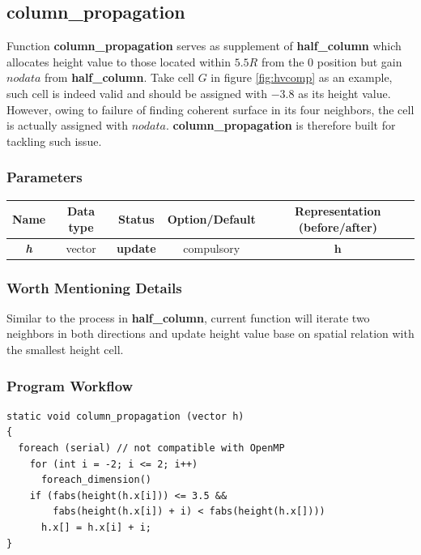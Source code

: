 \documentclass[a4paper]{article}
\newcommand{\func}[1]{\textbf{\textcolor{function}{#1}}}
\newcommand{\para}[1]{\textbf{\emph{\textcolor{para}{#1}}}}
\begin{document}
\subsection{\func{column\_propagation}}
Function \func{column\_propagation} serves as supplement of \func{half\_column} which allocates height value to those located within $5.5R$ from the 0 position but gain $nodata$ from \func{half\_column}. Take cell $G$ in figure \ref{fig:hvcomp} as an example, such cell is indeed valid and should be assigned with $-3.8$ as its height value. However, owing to failure of finding coherent surface in its four neighbors, the cell is actually assigned with $nodata$. \func{column\_propagation} is therefore built for tackling such issue.
\subsubsection{Parameters}
\begin{center}
  \begin{tabular}{|c|c|c|c|c|}
    \hline
    Name & Data type & Status & Option/Default & Representation (before/after)\\[0.5ex]
    \hline\hline
    \rowcolor{output}\para{h} & vector & \textbf{update} & compulsory & $\mathbf{h}$\\
    \hline
  \end{tabular}
\end{center}
\subsubsection{Worth Mentioning Details}
Similar to the process in \func{half\_column}, current function will iterate two neighbors in both directions and update height value base on spatial relation with the smallest height cell.
\subsubsection{Program Workflow}
\begin{multicols}{2}
 \columnbreak
 \begin{verbatim}
static void column_propagation (vector h)
{
  foreach (serial) // not compatible with OpenMP
    for (int i = -2; i <= 2; i++)
      foreach_dimension()
	if (fabs(height(h.x[i])) <= 3.5 &&
	    fabs(height(h.x[i]) + i) < fabs(height(h.x[])))
	  h.x[] = h.x[i] + i;
}
 \end{verbatim} 
\end{multicols}
\end{document}
